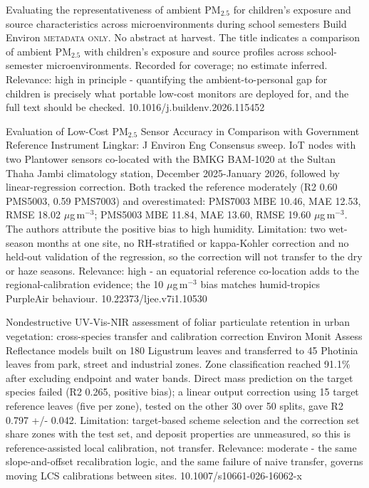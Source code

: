 \documentclass[10pt]{article}
\begin{document}
{Evaluating the representativeness of ambient PM$_{2.5}$ for children's exposure and source characteristics across microenvironments during school semesters}
{Build Environ}
{\textsc{metadata only.} No abstract at harvest. The title indicates a comparison of ambient PM$_{2.5}$ with children's exposure and source profiles across school-semester microenvironments. Recorded for coverage; no estimate inferred. Relevance: high in principle - quantifying the ambient-to-personal gap for children is precisely what portable low-cost monitors are deployed for, and the full text should be checked.}
{10.1016/j.buildenv.2026.115452}

\par{}\baselineskip{}\baselineskip
{}

{Evaluation of Low-Cost PM$_{2.5}$ Sensor Accuracy in Comparison with Government Reference Instrument}
{Lingkar: J Environ Eng}
{Consensus sweep. IoT nodes with two Plantower sensors co-located with the BMKG BAM-1020 at the Sultan Thaha Jambi climatology station, December 2025-January 2026, followed by linear-regression correction. Both tracked the reference moderately (R2 0.60 PMS5003, 0.59 PMS7003) and overestimated: PMS7003 MBE 10.46, MAE 12.53, RMSE 18.02 $\mu$g\,m$^{-3}$; PMS5003 MBE 11.84, MAE 13.60, RMSE 19.60 $\mu$g\,m$^{-3}$. The authors attribute the positive bias to high humidity. Limitation: two wet-season months at one site, no RH-stratified or kappa-Kohler correction and no held-out validation of the regression, so the correction will not transfer to the dry or haze seasons. Relevance: high - an equatorial reference co-location adds to the regional-calibration evidence; the 10 $\mu$g\,m$^{-3}$ bias matches humid-tropics PurpleAir behaviour.}
{10.22373/ljee.v7i1.10530}

{Nondestructive UV-Vis-NIR assessment of foliar particulate retention in urban vegetation: cross-species transfer and calibration correction}
{Environ Monit Assess}
{Reflectance models built on 180 Ligustrum leaves and transferred to 45 Photinia leaves from park, street and industrial zones. Zone classification reached 91.1\% after excluding endpoint and water bands. Direct mass prediction on the target species failed (R2 0.265, positive bias); a linear output correction using 15 target reference leaves (five per zone), tested on the other 30 over 50 splits, gave R2 0.797 +/- 0.042. Limitation: target-based scheme selection and the correction set share zones with the test set, and deposit properties are unmeasured, so this is reference-assisted local calibration, not transfer. Relevance: moderate - the same slope-and-offset recalibration logic, and the same failure of naive transfer, governs moving LCS calibrations between sites.}
{10.1007/s10661-026-16062-x}
\end{document}
